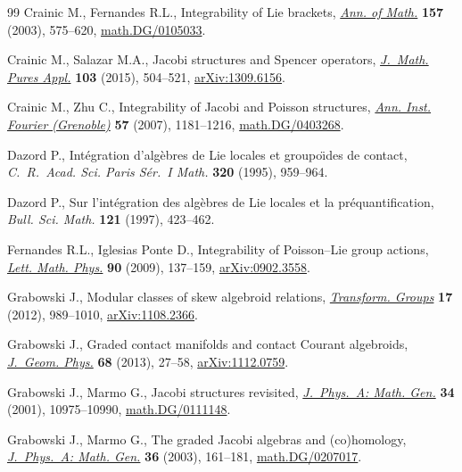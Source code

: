 \documentclass[pdftex]{sigma}
\numberwithin{equation}{section}
\begin{document}
\begin{thebibliography}{99}
Crainic M., Fernandes R.L., Integrability of {L}ie brackets, \href{https://doi.org/10.4007/annals.2003.157.575}{\textit{Ann. of
 Math.}} \textbf{157} (2003), 575--620, \href{https://arxiv.org/abs/math.DG/0105033}{math.DG/0105033}.

Crainic M., Salazar M.A., Jacobi structures and {S}pencer operators,
 \href{https://doi.org/10.1016/j.matpur.2014.04.012}{\textit{J.~Math. Pures Appl.}} \textbf{103} (2015), 504--521,
 \href{https://arxiv.org/abs/1309.6156}{arXiv:1309.6156}.

Crainic M., Zhu C., Integrability of {J}acobi and {P}oisson structures,
 \href{https://doi.org/10.5802/aif.2291}{\textit{Ann. Inst. Fourier (Grenoble)}} \textbf{57} (2007), 1181--1216,
 \href{https://arxiv.org/abs/math.DG/0403268}{math.DG/0403268}.

Dazord P., Int\'egration d'alg\`ebres de {L}ie locales et groupo\"\i des de
 contact, \textit{C.~R.~Acad. Sci. Paris S\'er.~I Math.} \textbf{320} (1995),
 959--964.

Dazord P., Sur l'int\'egration des alg\`ebres de {L}ie locales et la
 pr\'equantif\/ication, \textit{Bull. Sci. Math.} \textbf{121} (1997), 423--462.

Fernandes R.L., Iglesias Ponte D., Integrability of {P}oisson--{L}ie group
 actions, \href{https://doi.org/10.1007/s11005-009-0348-x}{\textit{Lett. Math. Phys.}} \textbf{90} (2009), 137--159,
 \href{https://arxiv.org/abs/0902.3558}{arXiv:0902.3558}.

Grabowski J., Modular classes of skew algebroid relations, \href{https://doi.org/10.1007/s00031-012-9197-2}{\textit{Transform.
 Groups}} \textbf{17} (2012), 989--1010, \href{https://arxiv.org/abs/1108.2366}{arXiv:1108.2366}.

Grabowski J., Graded contact manifolds and contact {C}ourant algebroids,
 \href{https://doi.org/10.1016/j.geomphys.2013.02.001}{\textit{J.~Geom. Phys.}} \textbf{68} (2013), 27--58, \href{https://arxiv.org/abs/1112.0759}{arXiv:1112.0759}.

Grabowski J., Marmo G., Jacobi structures revisited, \href{https://doi.org/10.1088/0305-4470/34/49/316}{\textit{J.~Phys.~A: Math.
 Gen.}} \textbf{34} (2001), 10975--10990, \href{https://arxiv.org/abs/math.DG/0111148}{math.DG/0111148}.

Grabowski J., Marmo G., The graded {J}acobi algebras and (co)homology,
 \href{http://doi.org/10.1088/0305-4470/36/1/311}{\textit{J.~Phys.~A: Math. Gen.}} \textbf{36} (2003), 161--181,
 \href{https://arxiv.org/abs/math.DG/0207017}{math.DG/0207017}.


\end{thebibliography}
\end{document}
